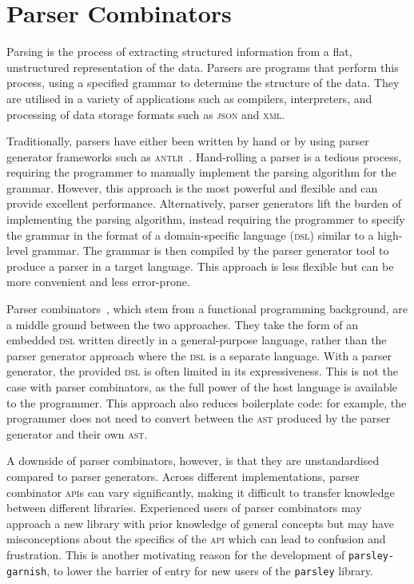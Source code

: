 \documentclass[../../main.tex]{subfiles}
\begin{document}
\section{Parser Combinators}

Parsing is the process of extracting structured information from a flat, unstructured representation of the data.
Parsers are programs that perform this process, using a specified grammar to determine the structure of the data.
They are utilised in a variety of applications such as compilers, interpreters, and processing of data storage formats such as \textsc{json} and \textsc{xml}.

Traditionally, parsers have either been written by hand or by using parser generator frameworks such as \textsc{antlr}~\cite{parr_antlr_2013}.
Hand-rolling a parser is a tedious process, requiring the programmer to manually implement the parsing algorithm for the grammar.
However, this approach is the most powerful and flexible and can provide excellent performance.
Alternatively, parser generators lift the burden of implementing the parsing algorithm, instead requiring the programmer to specify the grammar in the format of a domain-specific language (\textsc{dsl}) similar to a high-level grammar.
The grammar is then compiled by the parser generator tool to produce a parser in a target language.
This approach is less flexible but can be more convenient and less error-prone.

Parser combinators~\cite{hutton_higher-order_1992}, which stem from a functional programming background, are a middle ground between the two approaches.
They take the form of an embedded \textsc{dsl} written directly in a general-purpose language, rather than the parser generator approach where the \textsc{dsl} is a separate language.
With a parser generator, the provided \textsc{dsl} is often limited in its expressiveness.
This is not the case with parser combinators, as the full power of the host language is available to the programmer.
This approach also reduces boilerplate code: for example, the programmer does not need to convert between the \textsc{ast} produced by the parser generator and their own \textsc{ast}.

A downside of parser combinators, however, is that they are unstandardised compared to parser generators.
Across different implementations, parser combinator \textsc{api}s can vary significantly, making it difficult to transfer knowledge between different libraries.
Experienced users of parser combinators may approach a new library with prior knowledge of general concepts but may have misconceptions about the specifics of the \textsc{api} which can lead to confusion and frustration.
This is another motivating reason for the development of \texttt{parsley-garnish}, to lower the barrier of entry for new users of the \texttt{parsley} library.
\end{document}
